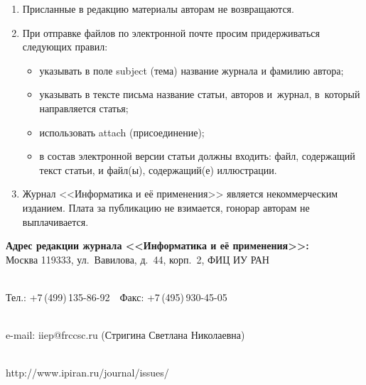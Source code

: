 {\begin{enumerate}[1.]
\item Присланные в редакцию материалы авторам не возвращаются.\\[-13.5pt]

\item При отправке файлов по электронной почте просим придерживаться следующих
правил:
\begin{itemize}
\item указывать в поле subject (тема) название журнала и фамилию автора;\\[-13.5pt]
\item указывать в тексте письма название статьи, авторов и~журнал, в~который направляется статья;\\[-13.5pt]
\item использовать attach (присоединение);\\[-13.5pt]
\item в состав электронной версии статьи должны входить: файл, содержащий текст
статьи, и файл(ы), содержащий(е) иллюстрации.\\[-13.5pt]
\end{itemize}

\item Журнал <<Информатика и её применения>> является некоммерческим изданием.
Плата за публикацию не взимается, гонорар авторам не выплачивается.
\end{enumerate}



\def\leftfootline{\small{\textbf{\thepage}
\hfill ИНФОРМАТИКА И ЕЁ ПРИМЕНЕНИЯ\ \ \ том\ 18\ \ \ выпуск\ 3\ \ \ 2024}
}%
 \def\rightfootline{\small{ИНФОРМАТИКА И ЕЁ ПРИМЕНЕНИЯ\ \ \ том\ 18\ \ \ выпуск\ 3\ \ \ 2024
\hfill \textbf{\thepage}}}


\vspace*{-1mm}

\begin{center}

\textbf{Адрес редакции журнала <<Информатика и её применения>>:} \\




Москва 119333, ул.~Вавилова, д.~44, корп.~2, ФИЦ ИУ РАН\\[-10pt]

\

Тел.: +7\,(499)\,135-86-92\ \ Факс:  +7\,(495)\,930-45-05\\[-10pt]

 \

e-mail:   {\sf iiep@frccsc.ru} (Стригина Светлана Николаевна)\\[-10pt]

\

{\sf http://www.ipiran.ru/journal/issues/}
\end{center}
}


